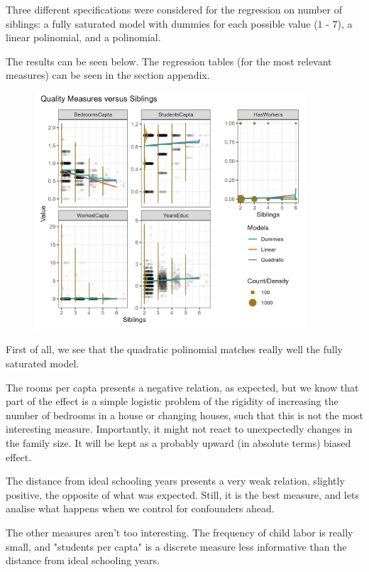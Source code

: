 \documentclass[12pt]{article}
\begin{document}
Three different specifications were considered for the regression on number of siblings: a fully saturated model with dummies for each possible value ($1$ - $7$), a linear polinomial, and a polinomial.

The results can be seen below. The regression tables (for the most relevant measures) can be seen in the section appendix.

\begin{figure}[!htbp]
    \centering
    \includegraphics[width=0.9\textwidth]{Figures/quality.png}
    \label{fig:quality}
\end{figure}

First of all, we see that the quadratic polinomial matches really well the fully saturated model.

The rooms per capta presents a negative relation, as expected, but we know that part of the effect is a simple logistic problem of the rigidity of increasing the number of bedrooms in a house or changing houses, such that this is not the most interesting measure. Importantly, it might not react to unexpectedly changes in the family size. It will be kept as a probably upward (in absolute terms) biased effect.

The distance from ideal schooling years presents a very weak relation, slightly positive, the opposite of what was expected. Still, it is the best measure, and lets analise what happens when we control for confounders ahead.

The other measures aren't too interesting. The frequency of child labor is really small, and "students per capta" is a discrete measure less informative than the distance from ideal schooling years.
\end{document}

